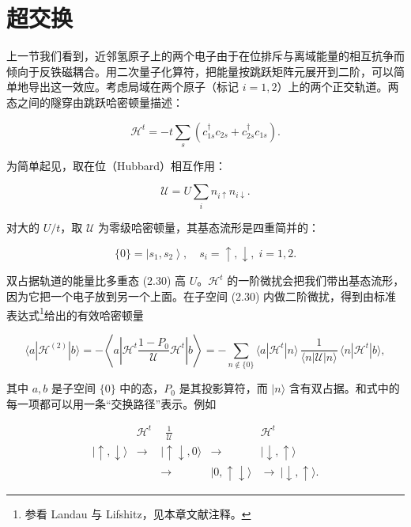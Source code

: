 \section{超交换}

上一节我们看到，近邻氢原子上的两个电子由于在位排斥与离域能量的相互抗争而倾向于反铁磁耦合。用二次量子化算符，把能量按跳跃矩阵元展开到二阶，可以简单地导出这一效应。考虑局域在两个原子（标记 $i = 1, 2$）上的两个正交轨道。两态之间的隧穿由跳跃哈密顿量描述：

\begin{equation*}
\mathcal {H} ^ {t} = - t \sum_ {s} \left( c _ {1s} ^ {\dagger} c _ {2s} + c _ {2s} ^ {\dagger} c _ {1s} \right).
\tag{2.28}
\end{equation*}

为简单起见，取在位（Hubbard）相互作用：

\begin{equation*}
\mathcal {U} = U \sum_ {i} n _ {i \uparrow} n _ {i \downarrow}.
\tag{2.29}
\end{equation*}

对大的 $U/t$，取 $\mathcal{U}$ 为零级哈密顿量，其基态流形是四重简并的：

\begin{equation*}
\{0 \} = \left| s _ {1}, s _ {2} \right\rangle , \quad s _ {i} = \uparrow , \downarrow, \; i = 1, 2.
\tag{2.30}
\end{equation*}

双占据轨道的能量比多重态 (2.30) 高 $U$。$\mathcal{H}^t$ 的一阶微扰会把我们带出基态流形，因为它把一个电子放到另一个上面。在子空间 (2.30) 内做二阶微扰，得到由标准表达式\footnote{参看 Landau 与 Lifshitz，见本章文献注释。}给出的有效哈密顿量

\begin{equation*}
\langle a | \mathcal {H} ^ {(2)} | b \rangle = - \left\langle a \left| \mathcal {H} ^ {t} \frac {1 - P _ {0}}{\mathcal {U}} \mathcal {H} ^ {t} \right| b \right\rangle = - \sum_ {n \not\in \{0 \}} \langle a | \mathcal {H} ^ {t} | n \rangle \, \frac {1}{\langle n | \mathcal {U} | n \rangle} \, \langle n | \mathcal {H} ^ {t} | b \rangle ,
\tag{2.31}
\end{equation*}

其中 $a, b$ 是子空间 $\{0\}$ 中的态，$P_{0}$ 是其投影算符，而 $|n\rangle$ 含有双占据。和式中的每一项都可以用一条“交换路径”表示。例如

\begin{equation*}
\begin{array}{ccccc}
 & \mathcal {H} ^ {t} & \ \ \frac {1}{\mathcal {U}}\ \ & & \mathcal {H} ^ {t} \\
| \uparrow , \downarrow \rangle & \to & | \uparrow \downarrow , 0 \rangle & \to & | \downarrow , \uparrow \rangle \\
 & & \to & | 0, \uparrow \downarrow \rangle & \to\ | \downarrow , \uparrow \rangle .
\end{array}
\tag{2.32}
\end{equation*}

